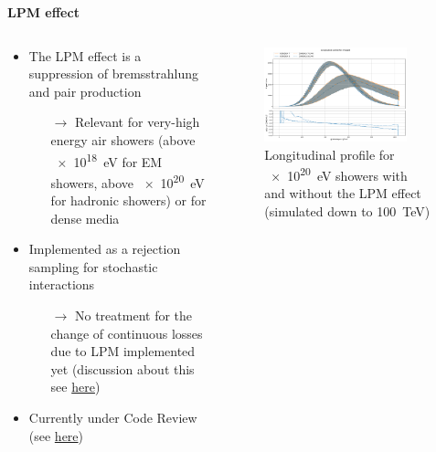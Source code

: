 \documentclass[aspectratio=1610, 9pt]{beamer}
\begin{document}
\begin{frame}

\textbf{LPM effect}

    \begin{columns}[onlytextwidth]
        \begin{column}{0.45\textwidth}
            \begin{itemize}
              \item The LPM effect is a suppression of bremsstrahlung and pair production
              \begin{itemize}
                \item[$\rightarrow$] Relevant for very-high energy air showers (above \SI{e18}{\electronvolt} for EM showers, above \SI{e20}{\electronvolt} for hadronic showers\footnotemark) or for dense media
              \end{itemize}
              \item Implemented as a rejection sampling for stochastic interactions
              \begin{itemize}
                \item[$\rightarrow$] No treatment for the change of continuous losses due to LPM implemented yet (discussion about this see \href{https://indico.scc.kit.edu/event/2580/contributions/9629/attachments/4716/7107/lpm_effect.pdf}{here})
              \end{itemize}
              \item Currently under Code Review (see \href{https://gitlab.iap.kit.edu/AirShowerPhysics/corsika/-/merge_requests/471}{here})
            \end{itemize}
        \end{column}
        \begin{column}{0.55\textwidth}
            \begin{figure}
                \centering
                \includegraphics[width=0.85\textwidth]{plots/long_charged_LPM.png}
                \caption{Longitudinal profile for \SI{e20}{\electronvolt} showers with and without the LPM effect (simulated down to \SI{100}{\tera\electronvolt})}
            \end{figure}
        \end{column}
    \end{columns}
\end{frame}
\end{document}
